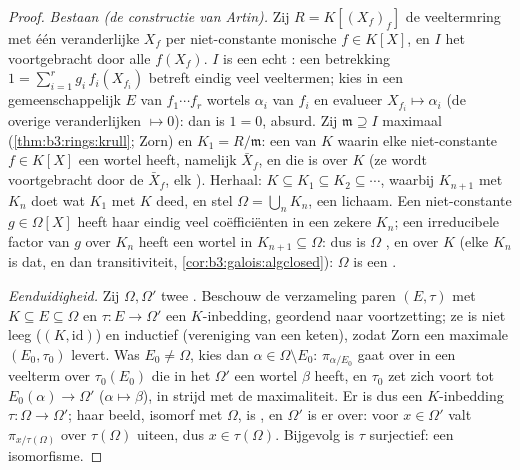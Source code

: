 \begin{proof}
\emph{Bestaan (de constructie van Artin).} Zij $R = K[(X_f)_f]$ de
veeltermring met één veranderlijke $X_f$ per niet-constante
monische $f \in K[X]$, en $I$ het  voortgebracht door alle
$f(X_f)$. $I$ is een echt : een betrekking $1 =
\sum_{i=1}^r g_i\, f_i(X_{f_i})$ betreft eindig veel veeltermen;
kies in een gemeenschappelijk  $E$ van $f_1\cdots
f_r$ wortels $\alpha_i$ van $f_i$ en evalueer $X_{f_i} \mapsto
\alpha_i$ (de overige veranderlijken $\mapsto 0$): dan is $1 = 0$,
absurd. Zij $\mathfrak m \supseteq I$ maximaal
(\cref{thm:b3:rings:krull}; Zorn) en $K_1 = R/\mathfrak m$: een
 van $K$ waarin elke niet-constante $f \in
K[X]$ een wortel heeft, namelijk $\bar X_f$, en die  is
over $K$ (ze wordt voortgebracht door de $\bar X_f$, elk
). Herhaal: $K \subseteq K_1 \subseteq K_2 \subseteq
\cdots$, waarbij $K_{n+1}$ met $K_n$ doet wat $K_1$ met $K$ deed,
en stel $\Omega = \bigcup_n K_n$, een lichaam. Een niet-constante
$g \in \Omega[X]$ heeft haar eindig veel coëfficiënten in een
zekere $K_n$; een irreducibele factor van $g$ over $K_n$ heeft een
wortel in $K_{n+1} \subseteq \Omega$: dus is $\Omega$ , en  over $K$ (elke $K_n$ is dat, en dan
transitiviteit, \cref{cor:b3:galois:algclosed}): $\Omega$ is een
.

\emph{Eenduidigheid.} Zij $\Omega, \Omega'$ twee . Beschouw de verzameling paren $(E, \tau)$ met $K
\subseteq E \subseteq \Omega$ en $\tau\colon E \to \Omega'$ een
$K$-inbedding, geordend naar voortzetting; ze is niet leeg ($(K,
\mathrm{id})$) en inductief (vereniging van een keten), zodat Zorn
een maximale $(E_0, \tau_0)$ levert. Was $E_0 \neq \Omega$, kies
dan $\alpha \in \Omega\setminus E_0$: $\pi_{\alpha/E_0}$ gaat over
in een veelterm over $\tau_0(E_0)$ die in het 
$\Omega'$ een wortel $\beta$ heeft, en $\tau_0$ zet zich voort tot
$E_0(\alpha) \to \Omega'$ ($\alpha \mapsto \beta$), in strijd met
de maximaliteit. Er is dus een $K$-inbedding $\tau \colon \Omega
\to \Omega'$; haar beeld, isomorf met $\Omega$, is , en $\Omega'$ is er  over: voor $x \in
\Omega'$ valt $\pi_{x/\tau(\Omega)}$ over $\tau(\Omega)$ uiteen,
dus $x \in \tau(\Omega)$. Bijgevolg is $\tau$ surjectief: een
isomorfisme.
\end{proof}

